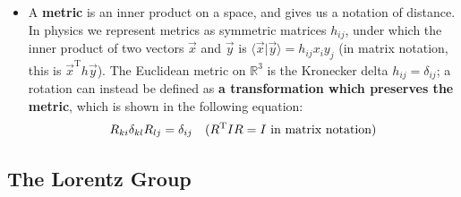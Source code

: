 \documentclass[12pt]{article}
\theoremstyle{mytheorem}
\begin{document}
\begin{itemize}
	\item A \textbf{metric} is an inner product on a space, and gives us a notation of distance. In physics we represent 
	metrics as symmetric matrices $h_{ij}$, under which the inner product of two vectors $\vec x$ and $\vec y$ is 
	$\langle\vec x | \vec y\rangle = h_{ij} x_i y_j$ (in matrix notation, this is $\vec x^\mathrm{T} h \vec y$). The Euclidean 
	metric on $\mathbb R^3$ is the Kronecker delta $h_{ij} = \delta_{ij}$; a rotation can instead be defined as \textbf{a 
	transformation which preserves the metric}, which is shown in the following equation:
	\begin{align}
	R_{ki} \delta_{kl} R_{lj} = \delta_{ij} && (R^\mathrm{T} I R = I \textnormal{ in matrix notation})
	\label{eq:rotational_invariance}
	\end{align}
\end{itemize}

\subsection*{The Lorentz Group}
\end{document}
